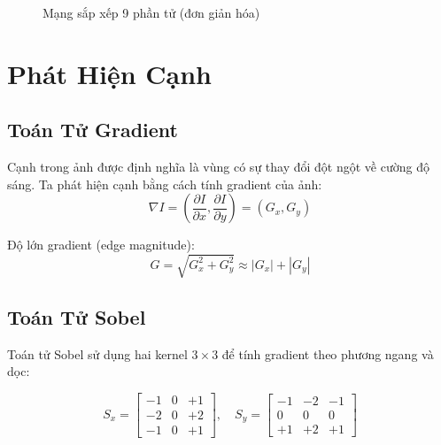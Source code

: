 \documentclass[12pt,a4paper]{report}
\begin{document}
\begin{figure}[H]
\centering
{}
\caption{Mạng sắp xếp 9 phần tử (đơn giản hóa)}
\label{fig:sorting_network}
\end{figure}

\section{Phát Hiện Cạnh}

\subsection{Toán Tử Gradient}
Cạnh trong ảnh được định nghĩa là vùng có sự thay đổi đột ngột về cường độ sáng. Ta phát hiện cạnh bằng cách tính gradient của ảnh:
\begin{equation}
    \nabla I = \left( \frac{\partial I}{\partial x}, \frac{\partial I}{\partial y} \right) = (G_x, G_y)
\end{equation}

Độ lớn gradient (edge magnitude):
\begin{equation}
    G = \sqrt{G_x^2 + G_y^2} \approx |G_x| + |G_y|
\end{equation}

\subsection{Toán Tử Sobel}
Toán tử Sobel sử dụng hai kernel $3\times3$ để tính gradient theo phương ngang và dọc:

\begin{equation}
    S_x = \begin{bmatrix} -1 & 0 & +1 \\ -2 & 0 & +2 \\ -1 & 0 & +1 \end{bmatrix}, \quad
    S_y = \begin{bmatrix} -1 & -2 & -1 \\ 0 & 0 & 0 \\ +1 & +2 & +1 \end{bmatrix}
\end{equation}
\end{document}
